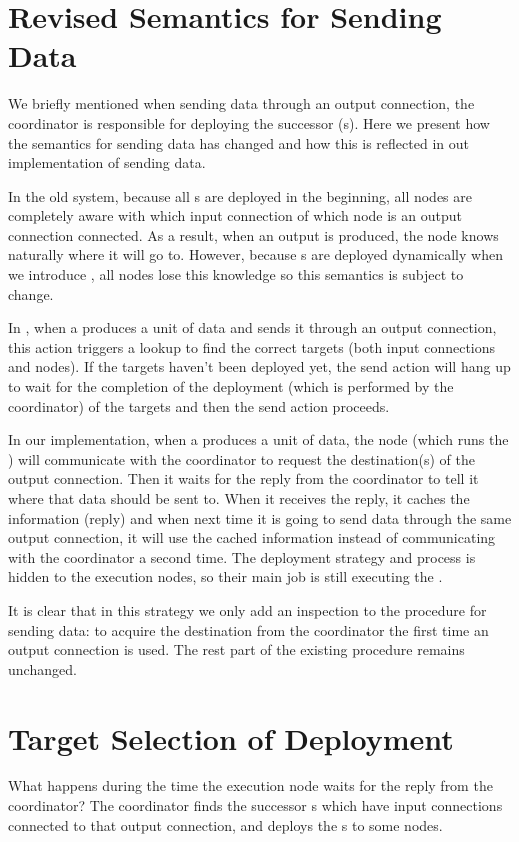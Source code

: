 \section{Revised Semantics for Sending Data}
We briefly mentioned when sending data through an output connection, the coordinator is responsible for deploying the successor \tPEInst{}(s). Here we present how the semantics for sending data has changed and how this is reflected in out implementation of sending data.

In the old \dpy system, because all \tPEInst{}s are deployed in the beginning, all nodes are completely aware with which input connection of which node is an output connection connected. As a result, when an output is produced, the node knows naturally where it will go to. However, because \tPEInst{}s are deployed dynamically when we introduce \tincdep, all nodes lose this knowledge so this semantics is subject to change.

In \tincdep, when a \tPEInst produces a unit of data and sends it through an output connection, this action triggers a lookup to find the correct targets (both input connections and nodes). If the targets haven't been deployed yet, the send action will hang up to wait for the completion of the deployment (which is performed by the coordinator) of the targets and then the send action proceeds.

In our implementation, when a \tPEInst produces a unit of data, the node (which runs the \tPEInst) will communicate with the coordinator to request the destination(s) of the output connection. Then it waits for the reply from the coordinator to tell it where that data should be sent to. When it receives the reply, it caches the information (reply) and when next time it is going to send data through the same output connection, it will use the cached information instead of communicating with the coordinator a second time. 
The deployment strategy and process is hidden to the execution nodes, so their main job is still executing the \tPEInst.

It is clear that in this strategy we only add an inspection to the procedure for sending data: to acquire the destination from the coordinator the first time an output connection is used. The rest part of the existing procedure remains unchanged.

\section{Target Selection of Deployment}
What happens during the time the execution node waits for the reply from the coordinator? The coordinator finds the successor \tPEInst{}s which have input connections connected to that output connection, and deploys the \tPEInst{}s to some nodes.

